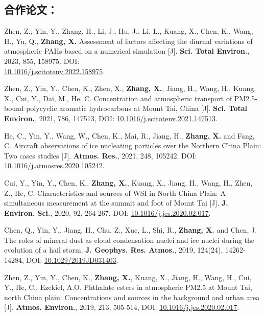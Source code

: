 \subsection*{合作论文：}

\begin{enumerate}[label={[\arabic*]}, leftmargin=20pt, widest=0, itemindent=*, topsep=0pt, partopsep=0pt, parsep=0pt]

\item Zhen, Z., Yin, Y., Zhang, H., Li, J., Hu, J., Li, L., Kuang, X., Chen, K., Wang, H., Yu, Q., \textbf{Zhang, X.}
Assessment of factors affecting the diurnal variations of atmospheric PAHs based on a numerical simulation [J].
\textbf{Sci. Total Environ.}, 2023, 855, 158975.
DOI: \\\underline{\href{https://doi.org/10.1016/j.scitotenv.2022.158975}{10.1016/j.scitotenv.2022.158975}}.


\item Zhen, Z., Yin, Y., Chen, K., Zhen, X., \textbf{Zhang, X.}, Jiang, H., Wang, H., Kuang, X., Cui, Y.,
Dai, M., He, C.
Concentration and atmospheric transport of PM2.5-bound polycyclic aromatic hydrocarbons at Mount Tai, China [J].
\textbf{Sci. Total Environ.}, 2021, 786, 147513,
DOI: \underline{\href{https://doi.org/10.1016/j.scitotenv.2021.147513}{10.1016/j.scitotenv.2021.147513}}.

\item He, C., Yin, Y., Wang, W., Chen, K., Mai, R., Jiang, H., \textbf{Zhang, X.} and Fang, C. Aircraft observations of ice nucleating particles over the Northern China Plain: Two cases studies [J].
\textbf{Atmos. Res.}, 2021, 248, 105242.
DOI: \underline{\href{https://doi.org/10.1016/j.atmosres.2020.105242}{10.1016/j.atmosres.2020.105242}}.

\item Cui, Y., Yin, Y., Chen, K., \textbf{Zhang, X.}, Kuang, X., Jiang, H., Wang, H., Zhen, Z., He, C.
Characteristics and sources of WSI in North China Plain: A simultaneous measurement at the summit and foot of Mount Tai [J].
\textbf{J. Environ. Sci.}, 2020, 92, 264-267,
DOI: \underline{\href{https://doi.org/10.1016/j.jes.2020.02.017}{10.1016/j.jes.2020.02.017}}.

\item Chen, Q., Yin, Y., Jiang, H., Chu, Z., Xue, L., Shi, R., \textbf{Zhang, X.} and Chen, J.
The roles of mineral dust as cloud condensation nuclei and ice nuclei during the evolution of a hail storm.
\textbf{J. Geophys. Res. Atmos.}, 2019, 124(24), 14262-14284,
DOI: \underline{\href{https://doi.org/10.1029/2019JD031403}{10.1029/2019JD031403}}.

\item Zhen, Z., Yin, Y., Chen, K., \textbf{Zhang, X.}, Kuang, X., Jiang, H., Wang, H., Cui, Y., He, C.,
Ezekiel, A.O.
Phthalate esters in atmospheric PM2.5 at Mount Tai, north China plain: Concentrations and sources in the background and urban area [J].
\textbf{Atmos. Environ.}, 2019, 213, 505-514,
DOI: \underline{\href{https://doi.org/10.1016/j.atmosenv.2019.06.039}{10.1016/j.jes.2020.02.017}}.

\end{enumerate}

